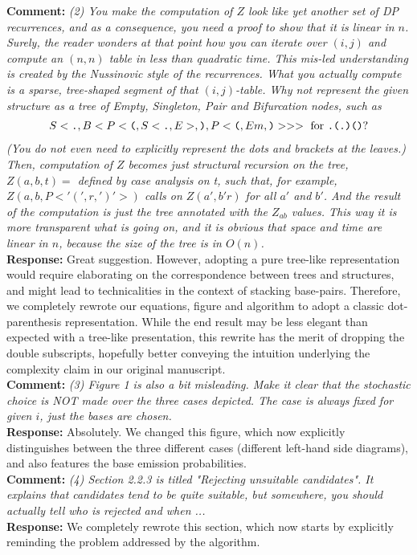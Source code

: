 \documentclass[11pt,hyperref,draft]{article} %
\newcommand{\Answer}[1]{\noindent\textsf{\textbf{Response: }}{\sf#1}\\}
\newcommand{\Comment}[1]{\noindent\textsf{\textbf{Comment: }}{\it#1}\\[.5em]}
\begin{document}
\Comment{(2) You make the computation of $Z$ look like yet another set of DP recurrences, and as a consequence, you need a proof to show that it is linear in $n$. Surely, the reader wonders at that point how you can iterate over $(i,j)$ and compute an $(n,n)$ table in less than quadratic time. This mis-led understanding is created by the Nussinovic style of the recurrences.
 What you actually compute is a sparse, tree-shaped segment of that $(i,j)$-table.
 Why not represent the given structure as a tree of Empty, Singleton, Pair and Bifurcation nodes, such as 
\begin{align*}
  S<\texttt{.},B<P<\texttt{(},S<\texttt{.},E>,\texttt{)},P<\texttt{(},Em,\texttt{)}>>> \text{ for {\tt .(.)()}}  ? 
\end{align*}
 (You do not even need to explicitly represent the dots and brackets at the leaves.)\\
 Then, computation of $Z$ becomes just structural recursion on the tree,
     $Z(a,b, t) =$ defined by case analysis on t, such that, for example,
     $Z(a,b,P<'(',r,')'>)$ calls on $Z(a',b' r)$ for all $a'$ and $b'$.
And the result of the computation is just the tree annotated with the $Z_{ab}$ values. 
This way it is more transparent what is going on, and it is obvious that space and time are linear in $n$, because the size of the tree is in $O(n)$.}
\Answer{Great suggestion. However, adopting a pure tree-like representation would require elaborating on the correspondence between trees and structures, and might lead to technicalities in the context of stacking base-pairs. Therefore, we completely rewrote our equations, figure and algorithm to adopt a classic dot-parenthesis representation. While the end result may be less elegant than expected with a tree-like presentation, this rewrite has the merit of dropping the double subscripts, hopefully better conveying the  intuition underlying the complexity claim in our original manuscript.}

\Comment{(3) Figure 1 is also a bit misleading. Make it clear that the stochastic choice is NOT made over the three cases depicted. The case is always fixed for given $i$, just the bases are chosen.}
\Answer{Absolutely. We changed this figure, which now explicitly distinguishes between the three different cases (different left-hand side diagrams), and also features the base emission probabilities.}

\Comment{(4) Section 2.2.3 is titled "Rejecting unsuitable candidates". It explains that candidates tend to be quite suitable, but somewhere, you should actually tell who is rejected and when ... }
\Answer{We completely rewrote this section, which now starts by explicitly reminding the problem addressed by the algorithm.}
\end{document}
